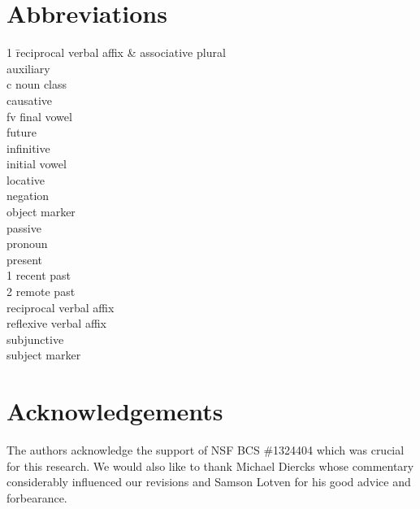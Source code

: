 \documentclass[output=paper,
modfonts
]{langscibook}
\begin{document}
\section*{Abbreviations}
\begin{multicols}{2}\label{pg:lesotho:abbreviations}
\begin{tabbing}
1 \hspace{.5cm} \= reciprocal verbal affix\kill
\& \>  associative plural\\
 \> auxiliary\\
c \> noun class\\
 \> causative\\
fv \> final vowel\\
 \> future\\
 \> infinitive\\
 \> initial vowel\\
 \> locative\\
 \> negation\\
 \> object marker\\
 \> passive\\
 \> pronoun\\
 \> present\\
1 \> recent past\\
2 \> remote past\\
 \> reciprocal verbal affix\\
 \> reflexive verbal affix\\
 \> subjunctive\\
 \> subject marker
\end{tabbing}
\end{multicols}
\section*{Acknowledgements}
The authors acknowledge the support of NSF BCS \#1324404 which was crucial for this research. We would also like to thank Michael Diercks whose commentary considerably influenced our revisions and Samson Lotven for his good advice and forbearance. 


{\sloppy\printbibliography[heading=subbibliography,notkeyword=this]}
\end{document}
